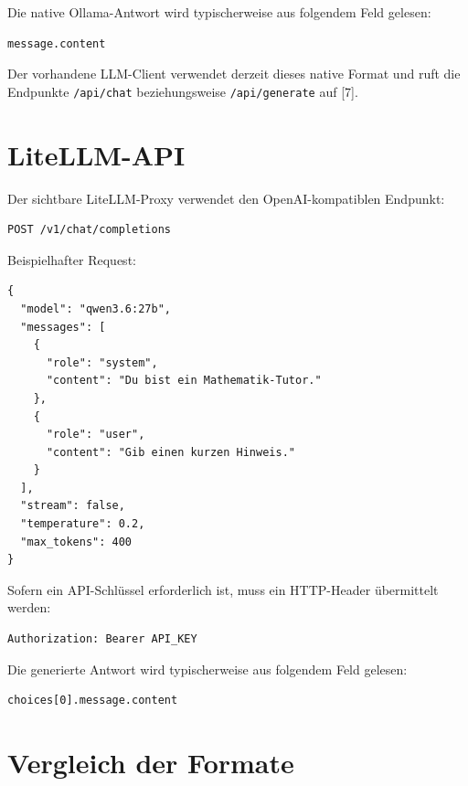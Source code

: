 \documentclass[11pt,a4paper,oneside,ngerman]{memoir}
\begin{document}
Die native Ollama-Antwort wird typischerweise aus folgendem Feld gelesen:

\begin{verbatim}
message.content
\end{verbatim}

Der vorhandene LLM-Client verwendet derzeit dieses native Format und ruft die Endpunkte \texttt{/api/chat} beziehungsweise \texttt{/api/generate} auf [7].

\section{LiteLLM-API}

Der sichtbare LiteLLM-Proxy verwendet den OpenAI-kompatiblen Endpunkt:

\begin{verbatim}
POST /v1/chat/completions
\end{verbatim}

Beispielhafter Request:

\begin{verbatim}
{
  "model": "qwen3.6:27b",
  "messages": [
    {
      "role": "system",
      "content": "Du bist ein Mathematik-Tutor."
    },
    {
      "role": "user",
      "content": "Gib einen kurzen Hinweis."
    }
  ],
  "stream": false,
  "temperature": 0.2,
  "max_tokens": 400
}
\end{verbatim}

Sofern ein API-Schlüssel erforderlich ist, muss ein HTTP-Header übermittelt werden:

\begin{verbatim}
Authorization: Bearer API_KEY
\end{verbatim}

Die generierte Antwort wird typischerweise aus folgendem Feld gelesen:

\begin{verbatim}
choices[0].message.content
\end{verbatim}

\section{Vergleich der Formate}
\end{document}
